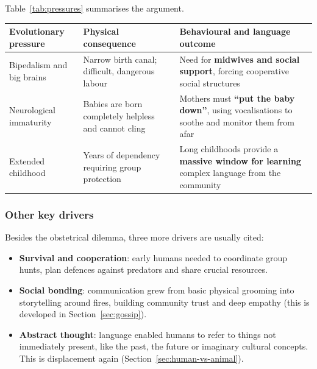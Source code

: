 Table~\ref{tab:pressures} summarises the argument.

\begin{center}
\small
\begin{tabularx}{\linewidth}{@{}>{\raggedright\arraybackslash}p{2.6cm}
                               >{\raggedright\arraybackslash}p{4.1cm} X@{}}
\toprule
\textbf{Evolutionary pressure} & \textbf{Physical consequence} & \textbf{Behavioural and language outcome} \\
\midrule
Bipedalism and big brains & Narrow birth canal; difficult, dangerous labour &
  Need for \textbf{midwives and social support}, forcing cooperative social structures \\
Neurological immaturity & Babies are born completely helpless and cannot cling &
  Mothers must \textbf{``put the baby down''}, using vocalisations to soothe and monitor
  them from afar \\
Extended childhood & Years of dependency requiring group protection &
  Long childhoods provide a \textbf{massive window for learning} complex language from
  the community \\
\bottomrule
\end{tabularx}
\label{tab:pressures}
\end{center}

\subsubsection{Other key drivers}

Besides the obstetrical dilemma, three more drivers are usually cited:
\begin{itemize}[nosep]
  \item \textbf{Survival and cooperation}: early humans needed to coordinate group hunts,
        plan defences against predators and share crucial resources.
  \item \textbf{Social bonding}: communication grew from basic physical grooming into
        storytelling around fires, building community trust and deep empathy (this is
        developed in Section~\ref{sec:gossip}).
  \item \textbf{Abstract thought}: language enabled humans to refer to things not
        immediately present, like the past, the future or imaginary cultural concepts.
        This is displacement again (Section~\ref{sec:human-vs-animal}).
\end{itemize}

